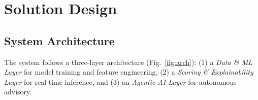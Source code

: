 \documentclass[12pt,a4paper]{article}
\begin{document}
\section{Solution Design}

\subsection{System Architecture}

The system follows a three-layer architecture (Fig.~\ref{fig:arch}): (1) a \textit{Data \& ML Layer} for model training and feature engineering, (2) a \textit{Scoring \& Explainability Layer} for real-time inference, and (3) an \textit{Agentic AI Layer} for autonomous advisory.
\end{document}
